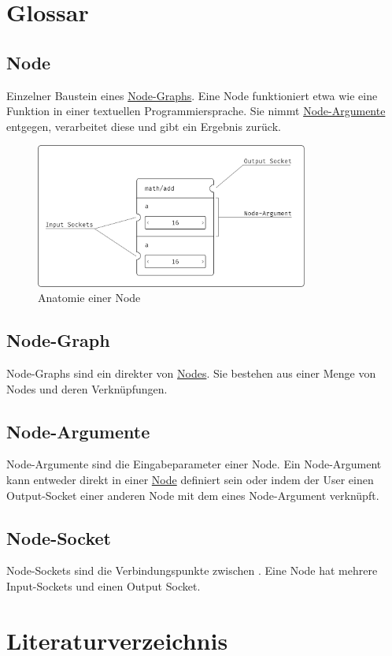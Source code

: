 \documentclass[ngerman]{article}
\begin{document}
\pagebreak
\section{Glossar}

\subsection{Node}
\label{sec:Node}
Einzelner Baustein eines \hyperref[sec:Node-Graph]{Node-Graphs}. Eine Node funktioniert etwa wie eine Funktion in einer textuellen Programmiersprache. Sie nimmt \hyperref[sec:Node-Argumente]{Node-Argumente} entgegen, verarbeitet diese und gibt ein Ergebnis zurück. 

\begin{figure}[htbp]
    \centering
    \includegraphics[width=0.8\textwidth]{graphics/NODE_ANATOMY.pdf}
    \caption{Anatomie einer Node}
    \label{sec:NODE_ANATOMY}
\end{figure}

\subsection{Node-Graph}
\label{sec:Node-Graph}
Node-Graphs sind ein direkter  von \hyperref[sec:Node]{Nodes}. Sie bestehen aus einer Menge von Nodes und deren Verknüpfungen. 

\subsection{Node-Argumente}
\label{sec:Node-Argumente}
Node-Argumente sind die Eingabeparameter einer Node. Ein Node-Argument kann entweder direkt in einer \hyperref[sec:Node]{Node} definiert sein oder indem der User einen Output-Socket einer anderen Node mit dem  eines Node-Argument verknüpft.

\subsection{Node-Socket}
\label{sec:Node-Socket}
Node-Sockets sind die Verbindungspunkte zwischen . Eine Node hat mehrere Input-Sockets und einen Output Socket.


\pagebreak
\section{Literaturverzeichnis}

\printbibliography
\end{document}

